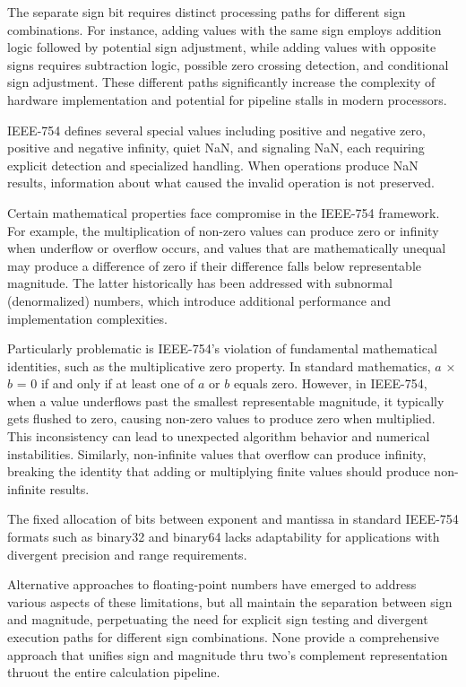\documentclass[12pt,letter]{article}
\begin{document}
The separate sign bit requires distinct processing paths for different sign combinations. For instance, adding values with the same sign employs addition logic followed by potential sign adjustment, while adding values with opposite signs requires subtraction logic, possible zero crossing detection, and conditional sign adjustment. These different paths significantly increase the complexity of hardware implementation and potential for pipeline stalls in modern processors.

IEEE-754 defines several special values including positive and negative zero, positive and negative infinity, quiet NaN, and signaling NaN, each requiring explicit detection and specialized handling. When operations produce NaN results, information about what caused the invalid operation is not preserved.

Certain mathematical properties face compromise in the IEEE-754 framework. For example, the multiplication of non-zero values can produce zero or infinity when underflow or overflow occurs, and values that are mathematically unequal may produce a difference of zero if their difference falls below representable magnitude. The latter historically has been addressed with subnormal (denormalized) numbers, which introduce additional performance and implementation complexities.

\newpage
Particularly problematic is IEEE-754's violation of fundamental mathematical identities, such as the multiplicative zero property. In standard mathematics, $a$ × $b$ = 0 if and only if at least one of $a$ or $b$ equals zero. However, in IEEE-754, when a value underflows past the smallest representable magnitude, it typically gets flushed to zero, causing non-zero values to produce zero when multiplied. This inconsistency can lead to unexpected algorithm behavior and numerical instabilities. Similarly, non-infinite values that overflow can produce infinity, breaking the identity that adding or multiplying finite values should produce non-infinite results.

The fixed allocation of bits between exponent and mantissa in standard IEEE-754 formats such as binary32 and binary64 lacks adaptability for applications with divergent precision and range requirements.

Alternative approaches to floating-point numbers have emerged to address various aspects of these limitations, but all maintain the separation between sign and magnitude, perpetuating the need for explicit sign testing and divergent execution paths for different sign combinations. None provide a comprehensive approach that unifies sign and magnitude thru two's complement representation thruout the entire calculation pipeline.
\end{document}
